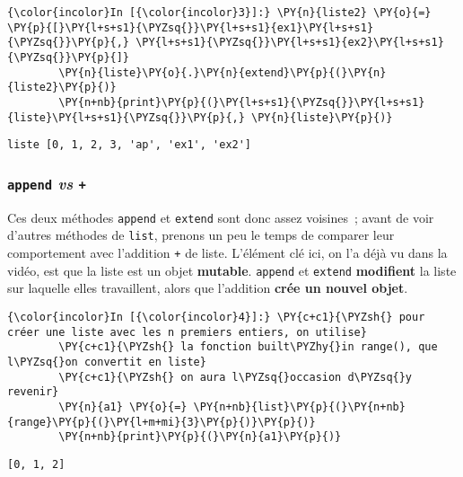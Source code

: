     \begin{Verbatim}[commandchars=\\\{\}]
{\color{incolor}In [{\color{incolor}3}]:} \PY{n}{liste2} \PY{o}{=} \PY{p}{[}\PY{l+s+s1}{\PYZsq{}}\PY{l+s+s1}{ex1}\PY{l+s+s1}{\PYZsq{}}\PY{p}{,} \PY{l+s+s1}{\PYZsq{}}\PY{l+s+s1}{ex2}\PY{l+s+s1}{\PYZsq{}}\PY{p}{]}
        \PY{n}{liste}\PY{o}{.}\PY{n}{extend}\PY{p}{(}\PY{n}{liste2}\PY{p}{)}
        \PY{n+nb}{print}\PY{p}{(}\PY{l+s+s1}{\PYZsq{}}\PY{l+s+s1}{liste}\PY{l+s+s1}{\PYZsq{}}\PY{p}{,} \PY{n}{liste}\PY{p}{)}
\end{Verbatim}


    \begin{Verbatim}[commandchars=\\\{\}]
liste [0, 1, 2, 3, 'ap', 'ex1', 'ex2']

    \end{Verbatim}

    \hypertarget{append-vs}{%
\subsubsection{\texorpdfstring{\texttt{append} \emph{vs}
\texttt{+}}{append vs +}}\label{append-vs}}

    Ces deux méthodes \texttt{append} et \texttt{extend} sont donc assez
voisines~; avant de voir d'autres méthodes de \texttt{list}, prenons un
peu le temps de comparer leur comportement avec l'addition \texttt{+} de
liste. L'élément clé ici, on l'a déjà vu dans la vidéo, est que la liste
est un objet \textbf{mutable}. \texttt{append} et \texttt{extend}
\textbf{modifient} la liste sur laquelle elles travaillent, alors que
l'addition \textbf{crée un nouvel objet}.

    \begin{Verbatim}[commandchars=\\\{\}]
{\color{incolor}In [{\color{incolor}4}]:} \PY{c+c1}{\PYZsh{} pour créer une liste avec les n premiers entiers, on utilise}
        \PY{c+c1}{\PYZsh{} la fonction built\PYZhy{}in range(), que l\PYZsq{}on convertit en liste}
        \PY{c+c1}{\PYZsh{} on aura l\PYZsq{}occasion d\PYZsq{}y revenir}
        \PY{n}{a1} \PY{o}{=} \PY{n+nb}{list}\PY{p}{(}\PY{n+nb}{range}\PY{p}{(}\PY{l+m+mi}{3}\PY{p}{)}\PY{p}{)}
        \PY{n+nb}{print}\PY{p}{(}\PY{n}{a1}\PY{p}{)}
\end{Verbatim}


    \begin{Verbatim}[commandchars=\\\{\}]
[0, 1, 2]

    \end{Verbatim}

